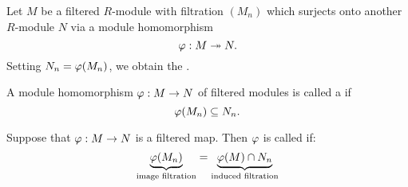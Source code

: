 \documentclass{ximera}
\begin{document}
\begin{definition}
  Let $M$ be a filtered $R$-module with filtration $(M_n)$ which
  surjects onto another $R$-module $N$ via a module homomorphism
  \[
  \varphi:M\twoheadrightarrow N.
  \]
  Setting $N_n = \varphi(M_n)$, we obtain the .
\end{definition}

\begin{definition}
  A module homomorphism $\varphi:M\to N$ of filtered modules is called a
   if
\[
\varphi(M_n)\subseteq N_n.
\]
\end{definition}

\begin{definition}
  Suppose that $\varphi:M\to N$ is a filtered map. Then $\varphi$ is called
   if:
\[
\underbrace{\varphi(M_n)}_{\text{image filtration}} = \underbrace{\varphi(M)\cap N_n}_{\text{induced filtration}}
\] 
\end{definition}
\end{document}
